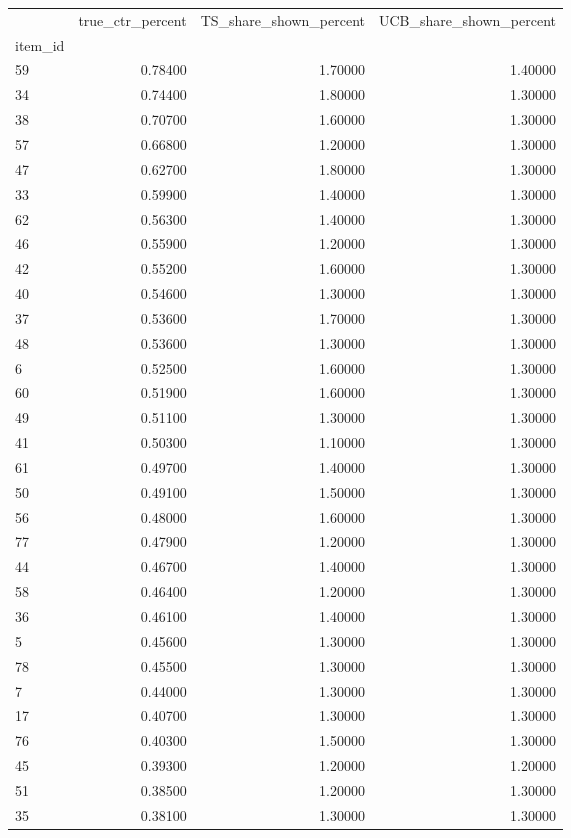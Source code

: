 \begin{tabular}{lrrr}
\toprule
 & true\_ctr\_percent & TS\_share\_shown\_percent & UCB\_share\_shown\_percent \\
item\_id &  &  &  \\
\midrule
59 & 0.78400 & 1.70000 & 1.40000 \\
34 & 0.74400 & 1.80000 & 1.30000 \\
38 & 0.70700 & 1.60000 & 1.30000 \\
57 & 0.66800 & 1.20000 & 1.30000 \\
47 & 0.62700 & 1.80000 & 1.30000 \\
33 & 0.59900 & 1.40000 & 1.30000 \\
62 & 0.56300 & 1.40000 & 1.30000 \\
46 & 0.55900 & 1.20000 & 1.30000 \\
42 & 0.55200 & 1.60000 & 1.30000 \\
40 & 0.54600 & 1.30000 & 1.30000 \\
37 & 0.53600 & 1.70000 & 1.30000 \\
48 & 0.53600 & 1.30000 & 1.30000 \\
6 & 0.52500 & 1.60000 & 1.30000 \\
60 & 0.51900 & 1.60000 & 1.30000 \\
49 & 0.51100 & 1.30000 & 1.30000 \\
41 & 0.50300 & 1.10000 & 1.30000 \\
61 & 0.49700 & 1.40000 & 1.30000 \\
50 & 0.49100 & 1.50000 & 1.30000 \\
56 & 0.48000 & 1.60000 & 1.30000 \\
77 & 0.47900 & 1.20000 & 1.30000 \\
44 & 0.46700 & 1.40000 & 1.30000 \\
58 & 0.46400 & 1.20000 & 1.30000 \\
36 & 0.46100 & 1.40000 & 1.30000 \\
5 & 0.45600 & 1.30000 & 1.30000 \\
78 & 0.45500 & 1.30000 & 1.30000 \\
7 & 0.44000 & 1.30000 & 1.30000 \\
17 & 0.40700 & 1.30000 & 1.30000 \\
76 & 0.40300 & 1.50000 & 1.30000 \\
45 & 0.39300 & 1.20000 & 1.20000 \\
51 & 0.38500 & 1.20000 & 1.30000 \\
35 & 0.38100 & 1.30000 & 1.30000 \\

\end{tabular}
